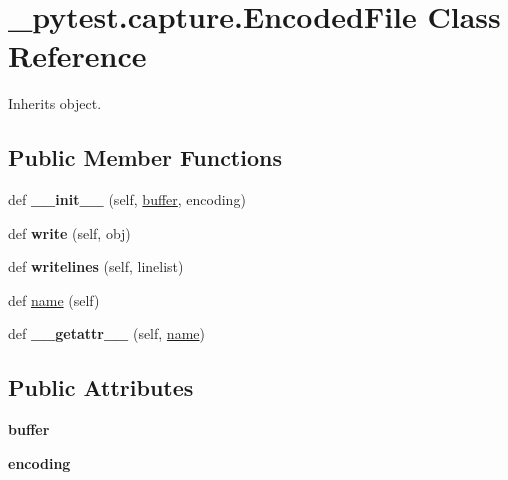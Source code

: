 \hypertarget{class__pytest_1_1capture_1_1_encoded_file}{}\section{\+\_\+pytest.\+capture.\+Encoded\+File Class Reference}
\label{class__pytest_1_1capture_1_1_encoded_file}


Inherits object.

\subsection*{Public Member Functions}
\begin{DoxyCompactItemize}
\item 
\mbox{\label{class__pytest_1_1capture_1_1_encoded_file_a7ed3efefdbf40fc6e53a2deaa6953a22}} 
def {\bfseries \+\_\+\+\_\+init\+\_\+\+\_\+} (self, \hyperlink{structbuffer}{buffer}, encoding)
\item 
\mbox{\label{class__pytest_1_1capture_1_1_encoded_file_a6aac593611bc5ace536ec3a221edfddf}} 
def {\bfseries write} (self, obj)
\item 
\mbox{\label{class__pytest_1_1capture_1_1_encoded_file_ac9ea7588e91a226aa28675a7a9b4f5a9}} 
def {\bfseries writelines} (self, linelist)
\item 
def \hyperlink{class__pytest_1_1capture_1_1_encoded_file_aa0a199ed5c643fa5783b598bf9cb264d}{name} (self)
\item 
\mbox{\label{class__pytest_1_1capture_1_1_encoded_file_a36db32ee2f973817ff6e896db65bff5b}} 
def {\bfseries \+\_\+\+\_\+getattr\+\_\+\+\_\+} (self, \hyperlink{class__pytest_1_1capture_1_1_encoded_file_aa0a199ed5c643fa5783b598bf9cb264d}{name})
\end{DoxyCompactItemize}
\subsection*{Public Attributes}
\begin{DoxyCompactItemize}
\item 
\mbox{\label{class__pytest_1_1capture_1_1_encoded_file_a4a4bcfca3995f5b56b3d8501ea62001e}} 
{\bfseries buffer}
\item 
\mbox{\label{class__pytest_1_1capture_1_1_encoded_file_afdc7c42e6b8590790742f6104fa9b1c7}} 
{\bfseries encoding}
\end{DoxyCompactItemize}
